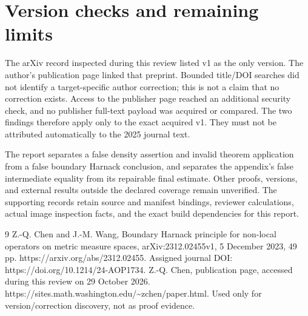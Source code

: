 \documentclass[10pt]{article}
\begin{document}
\section*{Version checks and remaining limits}
The arXiv record inspected during this review listed v1 as the only version. The author’s publication page linked that preprint. Bounded title/DOI searches did not identify a target-specific author correction; this is not a claim that no correction exists. Access to the publisher page reached an additional security check, and no publisher full-text payload was acquired or compared. The two findings therefore apply only to the exact acquired v1. They must not be attributed automatically to the 2025 journal text.\par
The report separates a false density assertion and invalid theorem application from a false boundary Harnack conclusion, and separates the appendix’s false intermediate equality from its repairable final estimate. Other proofs, versions, and external results outside the declared coverage remain unverified. The supporting records retain source and manifest bindings, reviewer calculations, actual image inspection facts, and the exact build dependencies for this report.\par
9 Z.-Q. Chen and J.-M. Wang, Boundary Harnack principle for non-local operators on metric measure spaces, arXiv:2312.02455v1, 5 December 2023, 49 pp. https://arxiv.org/abs/2312.02455. Assigned journal DOI: https://doi.org/10.1214/24-AOP1734. Z.-Q. Chen, publication page, accessed during this review on 29 October 2026. https://sites.math.washington.edu/\textasciitilde{}zchen/paper.html. Used only for version/correction discovery, not as proof evidence.\par
\end{document}
